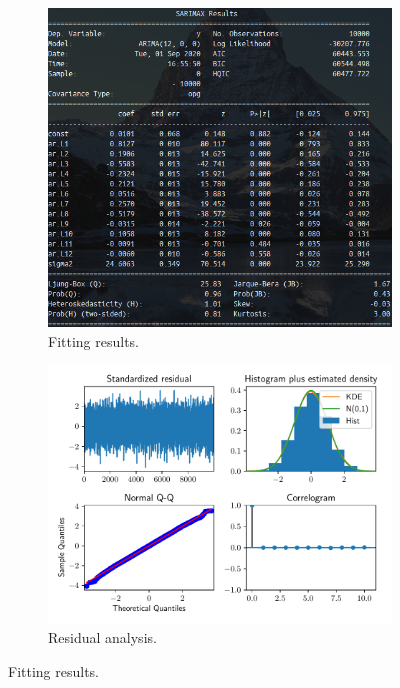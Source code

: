 \documentclass[fleqn]{article}
\begin{document}
\begin{figure}[H]
    \centering
    \begin{subfigure}[b]{0.45\textwidth}
        \centering
        \includegraphics[scale=0.5]{figs/res.png}
        \caption{Fitting results.}
        \label{fig:fit}
    \end{subfigure}
    \begin{subfigure}[b]{0.45\textwidth}  
        \centering 
        \includegraphics[width=1.35\textwidth]{figs/res.pdf}
        \caption{Residual analysis.}
        \label{fig:res}
    \end{subfigure}
    \caption{Fitting results.}
    \label{fig:ress}
\end{figure}

% 
% 
\end{document}
